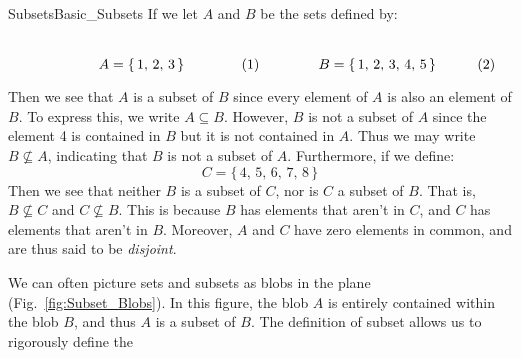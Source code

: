         \begin{fexample}{Subsets}{Basic_Subsets}
            If we let $A$ and $B$ be the sets defined by:
            \par
            \begin{subequations}
                \begin{minipage}[b]{0.49\textwidth}
                    \centering
                    \begin{equation}
                        A=\{\,1,\,2,\,3\,\}
                    \end{equation}
                \end{minipage}
                \hfill
                \begin{minipage}[b]{0.49\textwidth}
                    \centering
                    \begin{equation}
                        B=\{\,1,\,2,\,3,\,4,\,5\,\}
                    \end{equation}
                \end{minipage}
            \end{subequations}
            \par\vspace{2.5ex}
            Then we see that $A$ is a subset of $B$ since every element of
            $A$ is also an element of $B$. To express this, we write
            $A\subseteq{B}$. However, $B$ is not a subset of $A$ since the
            element 4 is contained in $B$ but it is not contained in $A$.
            Thus we may write $B\nsubseteq{A}$, indicating that $B$ is not a
            subset of $A$. Furthermore, if we define:
            \begin{equation}
                C=\{\,4,\,5,\,6,\,7,\,8\,\}
            \end{equation}
            Then we see that neither $B$ is a subset of $C$, nor is $C$ a
            subset of $B$. That is, $B\nsubseteq{C}$ and $C\nsubseteq{B}$.
            This is because $B$ has elements that aren't in $C$, and
            $C$ has elements that aren't in $B$. Moreover, $A$ and $C$ have
            zero elements in common, and are thus said to be
            \textit{disjoint}.
        \end{fexample}
        We can often picture sets and subsets as blobs in the plane
        (Fig.~\ref{fig:Subset_Blobs}). In this figure, the blob $A$ is
        entirely contained within the blob $B$, and thus $A$ is a subset of
        $B$. The definition of subset allows us to rigorously define the
